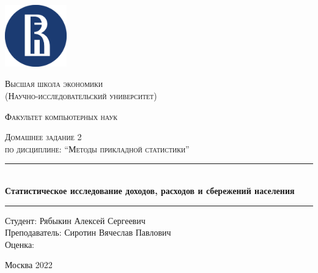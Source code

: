 \newcommand{\HRule}{\rule{\linewidth}{0.5mm}}

\begin{titlepage}

\centering
	\includegraphics[width=0.2\textwidth]{./title/logohse.png}\par\vspace{1cm}
	{\scshape \LARGE Высшая школа экономики \\ \small(Научно-исследовательский университет)\par}
	{\scshape \LARGE Факультет компьютерных наук\par}
	\vspace{3cm}
	{\scshape\Large Домашнее задание 2 \\ \normalsize{по дисциплине: ``Методы прикладной статистики''}\par}
    \HRule \\[0.4cm]
    { \Large \bfseries Статистическое исследование доходов, расходов и сбережений населения}\\[0.4cm] %
    \HRule
	\vspace{5cm}
	\begin{flushright}
	Студент: Рябыкин Алексей Сергеевич \\
	Преподаватель: Сиротин Вячеслав Павлович
	\\
	Оценка: \underline{\hspace{0.2cm}}
    \end{flushright}
    \vfill

	{\large Москва 2022}
\end{titlepage}
